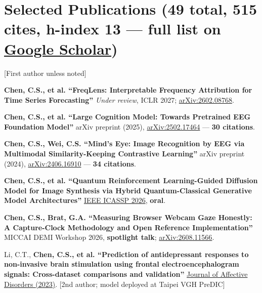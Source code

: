 \documentclass[letterpaper,10pt]{article}
\newcommand{\resumeSubHeadingListStart}{\begin{itemize}[leftmargin=0.15in, label={}]}
\newcommand{\resumeSubHeadingListEnd}{\end{itemize}}
\begin{document}
\section{Selected Publications \hfill \normalfont\small (49 total, 515 cites, h-index 13 --- full list on \href{https://scholar.google.com.tw/citations?user=5XHD7nkAAAAJ}{Google Scholar})}
  \vspace{2pt}
   [First author unless noted]
  \resumeSubHeadingListStart
    \small{\item{

    \textbf{Chen, C.S., et al. ``FreqLens: Interpretable Frequency Attribution for Time Series Forecasting''}{ \textit{Under review}, ICLR 2027; \href{https://arxiv.org/abs/2602.08768}{arXiv:2602.08768}.} \\ \vspace{1pt}

    \textbf{Chen, C.S., et al. ``Large Cognition Model: Towards Pretrained EEG Foundation Model''}{ arXiv preprint (2025), \href{https://arxiv.org/abs/2502.17464}{arXiv:2502.17464} --- \textbf{30 citations}.} \\ \vspace{1pt}

    \textbf{Chen, C.S., Wei, C.S. ``Mind's Eye: Image Recognition by EEG via Multimodal Similarity-Keeping Contrastive Learning''}{ arXiv preprint (2024), \href{https://arxiv.org/abs/2406.16910}{arXiv:2406.16910} --- \textbf{34 citations}.} \\ \vspace{1pt}

    \textbf{Chen, C.S., et al. ``Quantum Reinforcement Learning-Guided Diffusion Model for Image Synthesis via Hybrid Quantum-Classical Generative Model Architectures''}{ \href{https://doi.org/10.1109/ICASSP55912.2026.11461991}{IEEE ICASSP 2026}, \textbf{oral}.} \\ \vspace{1pt}

    \textbf{Chen, C.S., Brat, G.A. ``Measuring Browser Webcam Gaze Honestly: A Capture-Clock Methodology and Open Reference Implementation''}{ MICCAI DEMI Workshop 2026, \textbf{spotlight talk}; \href{https://arxiv.org/abs/2608.11566}{arXiv:2608.11566}.} \\ \vspace{1pt}

    Li, C.T., \textbf{Chen, C.S., et al. ``Prediction of antidepressant responses to non-invasive brain stimulation using frontal electroencephalogram signals: Cross-dataset comparisons and validation''}{ \href{https://doi.org/10.1016/j.jad.2023.08.059}{Journal of Affective Disorders (2023)}. [2nd author; model deployed at Taipei VGH PreDIC]}
    }}
  \resumeSubHeadingListEnd
\end{document}
